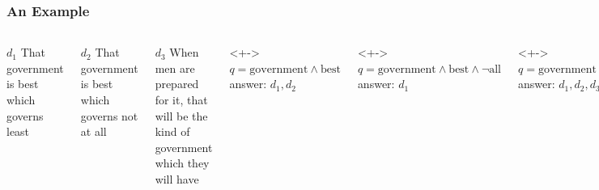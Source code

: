 \documentclass[svgnames]{beamer}
\begin{document}
\begin{frame}
  \frametitle{An Example}

  \begin{columns}
    \small


    \begin{block}{$d_1$}
      That government is best which governs least
    \end{block}
    \begin{block}{$d_2$}
      That government is best which governs not at all
    \end{block}
    \begin{block}{$d_3$}
      When men are prepared for it, that will be the kind of government which
      they will have
    \end{block}


    \begin{block}<+->{$q=\text{government} \wedge \text{best}$}
      answer: $d_1, d_2$
    \end{block}
    \begin{block}<+->{$q=\text{government} \wedge \text{best} \wedge
        \neg\text{all}$}
      answer: $d_1$
    \end{block}
    \begin{block}<+->{$q=\text{government} \vee \text{best} \wedge \neg
        \text{all}$}
      answer: $d_1, d_2, d_3$
    \end{block}
    
  \end{columns}
\end{frame}

\end{document}
